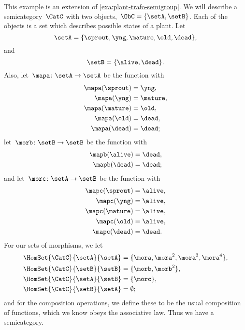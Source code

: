 \begin{example}
    \label{exa:semicat-plant-states}
    This example is an extension of \cref{exa:plant-trafo-semigroup}.
    We will describe a semicategory~$\CatC$ with two objects,~$\ObC = \{ \setA, \setB \}$.
    Each of the objects is a set which describes possible states of a plant.
    Let
    \begin{equation*}
        \setA = \{ \sprout, \yng, \mature, \old, \dead \},
    \end{equation*}
    and
    \begin{equation*}
        \setB = \{ \alive, \dead \}.
    \end{equation*}
    Also, let~$\mapa \colon \setA \to \setA$ be the function with
    \begin{align*}
        \mapa(\sprout) & =  \yng, \\
        \mapa(\yng)    & =  \mature, \\
        \mapa(\mature) & =  \old, \\
        \mapa( \old)   & = \dead, \\
        \mapa(\dead)   & = \dead;
    \end{align*}
    let~$\morb \colon \setB \to \setB$ be the function with
    \begin{align*}
        \mapb(\alive) & =  \dead, \\
        \mapb(\dead)  & =  \dead;
    \end{align*}
    and let~$\morc \colon \setA \to \setB$ be the function with
    \begin{align*}
        \mapc(\sprout) & = \alive, \\
        \mapc(\yng)    & =  \alive, \\
        \mapc(\mature) & = \alive , \\
        \mapc( \old)   & = \alive, \\
        \mapc (\dead)  & = \dead.
    \end{align*}
    For our sets of morphisms, we let
    \begin{align*}
        \HomSet{\CatC}{\setA}{\setA} & = \{ \mora, \mora^2, \mora^3, \mora^4 \}, \\
        \HomSet{\CatC}{\setB}{\setB} & =  \{ \morb, \morb^2 \}, \\
        \HomSet{\CatC}{\setA}{\setB} & =  \{ \morc \}, \\
        \HomSet{\CatC}{\setB}{\setA} & = \emptyset;
    \end{align*}
    and for the composition operations, we define these to be the usual composition of functions, which we know obeys the associative law.
    Thus we have a semicategory.
\end{example}

